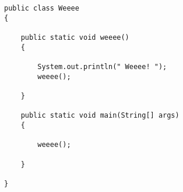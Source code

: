 \documentclass[12pt]{article}
\begin{document}
\begin{enumerate}
\begin{enumerate}
\begin{verbatim}
public class Weeee
{

    public static void weeee()
    {

        System.out.println(" Weeee! ");
        weeee();

    }

    public static void main(String[] args)
    {

        weeee();

    }

}
\end{verbatim}









\end{enumerate}
\end{enumerate}
\end{document}

